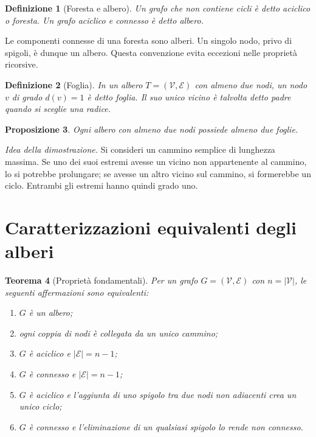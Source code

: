 \documentclass[11pt,a4paper]{article}
\newtheorem{definition}{Definizione}[section]
\newtheorem{theorem}[definition]{Teorema}
\newtheorem{proposition}[definition]{Proposizione}
\newcommand{\V}{\mathcal{V}}
\newcommand{\E}{\mathcal{E}}
\begin{document}
\begin{definition}[Foresta e albero]
Un grafo che non contiene cicli è detto \emph{aciclico} o \emph{foresta}. Un grafo aciclico e connesso è detto \emph{albero}.
\end{definition}

Le componenti connesse di una foresta sono alberi. Un singolo nodo, privo di spigoli, è dunque un albero. Questa convenzione evita eccezioni nelle proprietà ricorsive.

\begin{definition}[Foglia]
In un albero $T=(\V,\E)$ con almeno due nodi, un nodo $v$ di grado $d(v)=1$ è detto \emph{foglia}. Il suo unico vicino è talvolta detto padre quando si sceglie una radice.
\end{definition}

\begin{proposition}
Ogni albero con almeno due nodi possiede almeno due foglie.
\end{proposition}

\emph{Idea della dimostrazione.} Si consideri un cammino semplice di lunghezza massima. Se uno dei suoi estremi avesse un vicino non appartenente al cammino, lo si potrebbe prolungare; se avesse un altro vicino sul cammino, si formerebbe un ciclo. Entrambi gli estremi hanno quindi grado uno.

\section{Caratterizzazioni equivalenti degli alberi}

\begin{theorem}[Proprietà fondamentali]
Per un grafo $G=(\V,\E)$ con $n=|\V|$, le seguenti affermazioni sono equivalenti:
\begin{enumerate}[label=\arabic*.]
\item $G$ è un albero;
\item ogni coppia di nodi è collegata da un unico cammino;
\item $G$ è aciclico e $|\E|=n-1$;
\item $G$ è connesso e $|\E|=n-1$;
\item $G$ è aciclico e l'aggiunta di uno spigolo tra due nodi non adiacenti crea un unico ciclo;
\item $G$ è connesso e l'eliminazione di un qualsiasi spigolo lo rende non connesso.
\end{enumerate}
\end{theorem}
\end{document}
